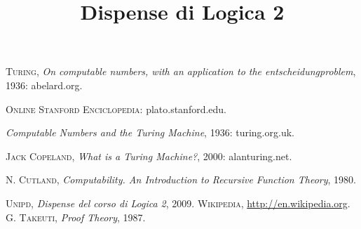 \documentclass[10pt,a4paper]{amsbook}
\title{Dispense di Logica 2}
\author{}
\date{}
\begin{document}
\maketitle

\tableofcontents







\begin{thebibliography} {}
 \textsc{Turing}, \textsl{On computable numbers, with an
application to the entscheidungproblem}, 1936: abelard.org.

 \textsc{Online Stanford Enciclopedia}: plato.stanford.edu.

 \textsl{Computable Numbers and the Turing Machine}, 1936:
turing.org.uk.

 \textsc{Jack Copeland}, \textsl{What is a Turing Machine?}, 2000:
alanturing.net.

 \textsc{N. Cutland}, \textsl{Computability. An
  Introduction to Recursive Function Theory}, 1980.

 \textsc{Unipd}, \textsl{Dispense del corso di Logica 2},
  2009.
 \textsc{Wikipedia}, \url{http://en.wikipedia.org}.
 \textsc{G. Takeuti}, \textsl{Proof Theory}, 1987.

\end{thebibliography}
\end{document}
